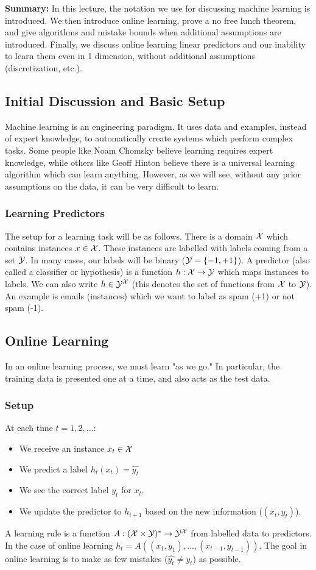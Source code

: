 \documentclass{article}
\begin{document}

\textbf{Summary: } In this lecture, the notation we use for discussing machine learning is introduced. We then introduce online learning, prove a no free lunch theorem, and give algorithms and mistake bounds when additional assumptions are introduced. Finally, we discuss online learning linear predictors and our inability to learn them even in 1 dimension, without additional assumptions (discretization, etc.).

\subsection{Initial Discussion and Basic Setup}
Machine learning is an engineering paradigm. It uses data and examples, instead of expert knowledge, to automatically create systems which perform complex tasks. Some people like Noam Chomsky believe learning requires expert knowledge, while others like Geoff Hinton believe there is a universal learning algorithm which can learn anything. However, as we will see, without any prior assumptions on the data, it can be very difficult to learn.
\subsubsection{Learning Predictors}
The setup for a learning task will be as follows. There is a domain $\mathcal{X}$ which contains instances $x \in \mathcal{X}$. These instances are labelled with labels coming from a set $\mathcal{Y}$. In many cases, our labels will be binary ($\mathcal{Y}  = \{-1, +1\}$). A predictor (also called a classifier or hypothesis) is a function $h: \mathcal{X} \rightarrow \mathcal{Y}$ which maps instances to labels. We can also write $h \in \mathcal{Y}^{\mathcal{X}}$ (this denotes the set of functions from $\mathcal{X}$ to $\mathcal{Y}$). An example is emails (instances) which we want to label as spam (+1) or not spam (-1). 
\subsection{Online Learning}
In an online learning process, we must learn "as we go." In particular, the training data is presented one at a time, and also acts as the test data. 
\subsubsection{Setup}
At each time $t = 1, 2,...$:
\begin{itemize}
    \item We receive an instance $x_t \in \mathcal{X}$
    \item We predict a label $h_t(x_t) = \hat{y_t}$
    \item We see the correct label $y_t$ for $x_t$.
    \item We update the predictor to $h_{t+1}$ based on the new information ($(x_t, y_t)$).
\end{itemize}
A learning rule is a function $A: (\mathcal{X} \times \mathcal{Y})^{*} \rightarrow \mathcal{Y}^{\mathcal{X}}$ from labelled data to predictors. In the case of online learning $h_t = A((x_1, y_1),...,(x_{t-1}, y_{t-1}))$. The goal in online learning is to make as few mistakes ($\hat{y_t} \neq y_t$) as possible.
\end{document}
